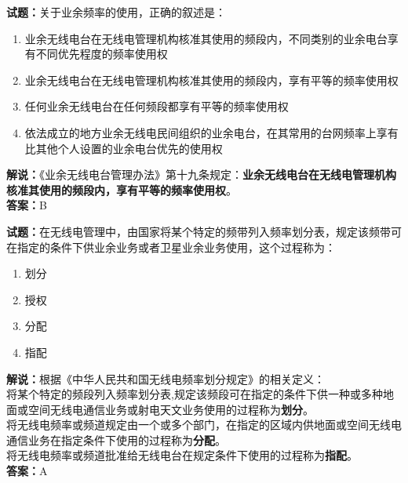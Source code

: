 \documentclass{ctexbook}
\begin{document}
\bigskip


\noindent\textbf{试题：}关于业余频率的使用，正确的叙述是：
\begin{enumerate}[leftmargin=3em]
	\item 业余无线电台在无线电管理机构核准其使用的频段内，不同类别的业余电台享有不同优先程度的频率使用权
	\item 业余无线电台在无线电管理机构核准其使用的频段内，享有平等的频率使用权
	\item 任何业余无线电台在任何频段都享有平等的频率使用权
	\item 依法成立的地方业余无线电民间组织的业余电台，在其常用的台网频率上享有比其他个人设置的业余电台优先的使用权
\end{enumerate}
\noindent\textbf{解说：}《业余无线电台管理办法》第十九条规定：\textbf{业余无线电台在无线电管理机构核准其使用的频段内，享有平等的频率使用权}。\\\noindent\textbf{答案：}B



\bigskip


\noindent\textbf{试题：}在无线电管理中，由国家将某个特定的频带列入频率划分表，规定该频带可在指定的条件下供业余业务或者卫星业余业务使用，这个过程称为：
\begin{enumerate}[leftmargin=3em]
	\item 划分
	\item 授权
	\item 分配
	\item 指配
\end{enumerate}
\noindent\textbf{解说：}根据《中华人民共和国无线电频率划分规定》的相关定义：\\将某个特定的频段列入频率划分表,规定该频段可在指定的条件下供一种或多种地面或空间无线电通信业务或射电天文业务使用的过程称为\textbf{划分}。\\将无线电频率或频道规定由一个或多个部门，在指定的区域内供地面或空间无线电通信业务在指定条件下使用的过程称为\textbf{分配}。\\将无线电频率或频道批准给无线电台在规定条件下使用的过程称为\textbf{指配}。\\
\textbf{答案：}A



\bigskip
\end{document}

